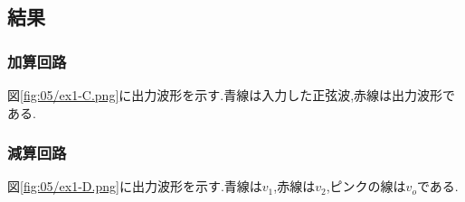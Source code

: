 \subsection{結果}
\subsubsection{加算回路}
図\ref{fig:05/ex1-C.png}に出力波形を示す.青線は入力した正弦波,赤線は出力波形である.
\subsubsection{減算回路}
図\ref{fig:05/ex1-D.png}に出力波形を示す.青線は$v_1$,赤線は$v_2$,ピンクの線は$v_o$である.
